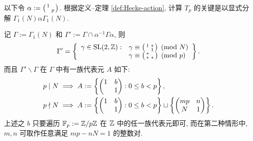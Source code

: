 以下令 $\alpha := \bigl(\begin{smallmatrix} 1 &  \\  & p \end{smallmatrix}\bigr)$. 根据定义--定理 \ref{def:Hecke-action}, 计算 $T_p$ 的关键是以显式分解 $\Gamma_1(N)\alpha\Gamma_1(N)$.

\begin{lemma}\label{prop:T_p-coset-decomp}
	记 $\Gamma := \Gamma_1(N)$ 和 $\Gamma' := \Gamma \cap \alpha^{-1}\Gamma\alpha$, 则
	\[ \Gamma' = \left\{ \begin{array}{rl}
		\gamma \in \operatorname{SL}(2,\mathbb{Z}) : & \gamma \equiv \bigl(\begin{smallmatrix} 1 & * \\  & 1 \end{smallmatrix}\bigr) \pmod N \\
		& \gamma \equiv \bigl(\begin{smallmatrix} * &  \\ * & * \end{smallmatrix}\bigr) \pmod p
	\end{array}\right\}. \]
	而且 $\Gamma' \backslash \Gamma$ 在 $\Gamma$ 中有一族代表元 $A$ 如下:
	\begin{align*}
		p \mid N & \implies A := \left\{ \begin{pmatrix} 1 & b \\  & 1 \end{pmatrix} : 0 \leq b < p \right\}, \\
		p \nmid N & \implies A := \left\{ \begin{pmatrix} 1 & b \\  & 1 \end{pmatrix} : 0 \leq b < p \right\} \sqcup \left\{ \begin{pmatrix} mp & n \\ N & 1 \end{pmatrix} \right \}.
	\end{align*}
	上述之 $b$ 只要遍历 $\mathbb{F}_p := \mathbb{Z}/p\mathbb{Z}$ 在 $\mathbb{Z}$ 中的任一族代表元即可, 而在第二种情形中, $m, n$ 可取作任意满足 $mp - nN = 1$ 的整数对.
\end{lemma}
